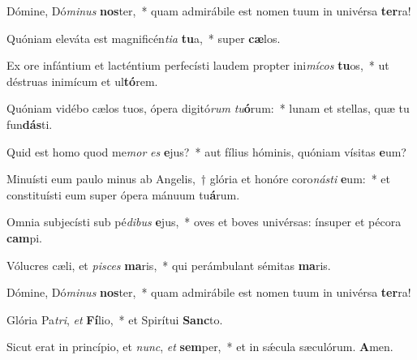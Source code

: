 \item Dómine, Dó\textit{mi}\textit{nus} \textbf{nos}ter,~* quam admirábile est nomen tuum in univérsa \textbf{ter}ra!
\item Quóniam eleváta est magnificén\textit{ti}\textit{a} \textbf{tu}a,~* super \textbf{cæ}los.
\item Ex ore infántium et lacténtium perfecísti laudem propter ini\textit{mí}\textit{cos} \textbf{tu}os,~* ut déstruas inimícum et ul\textbf{tó}rem.
\item Quóniam vidébo cælos tuos, ópera digitó\textit{rum} \textit{tu}\textbf{ó}rum:~* lunam et stellas, quæ tu fun\textbf{dás}ti.
\item Quid est homo quod me\textit{mor} \textit{es} \textbf{e}jus?~* aut fílius hóminis, quóniam vísitas \textbf{e}um?
\item Minuísti eum paulo minus ab Angelis,~† glória et honóre coro\textit{nás}\textit{ti} \textbf{e}um:~* et constituísti eum super ópera mánuum tu\textbf{á}rum.
\item Omnia subjecísti sub pé\textit{di}\textit{bus} \textbf{e}jus,~* oves et boves univérsas: ínsuper et pécora \textbf{cam}pi.
\item Vólucres cæli, et \textit{pi}\textit{sces} \textbf{ma}ris,~* qui perámbulant sémitas \textbf{ma}ris.
\item Dómine, Dó\textit{mi}\textit{nus} \textbf{nos}ter,~* quam admirábile est nomen tuum in univérsa \textbf{ter}ra!
\item Glória Pa\textit{tri}, \textit{et} \textbf{Fí}lio,~* et Spirítui \textbf{Sanc}to.
\item Sicut erat in princípio, et \textit{nunc}, \textit{et} \textbf{sem}per,~* et in sǽcula sæculórum. \textbf{A}men.
